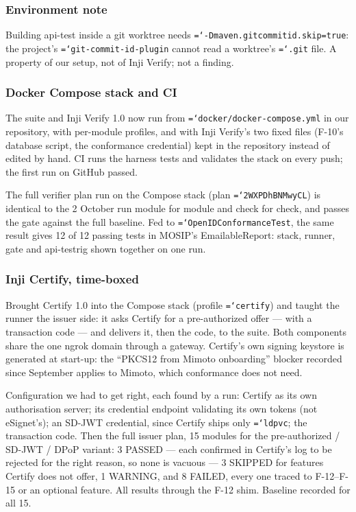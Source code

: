 \documentclass[11pt,a4paper]{article}
\let\origtexttt\texttt
\renewcommand{\texttt}[1]{\origtexttt{\hyphenchar\font=`\-\relax #1}}
\renewcommand{\_}{\textunderscore\allowbreak}
\begin{document}
\subsubsection*{Environment note}
Building api-test inside a git worktree needs \texttt{-Dmaven.gitcommitid.skip=true}: the
project's \texttt{git-commit-id-plugin} cannot read a worktree's \texttt{.git} file. A property of
our setup, not of Inji Verify; not a finding.

\subsubsection*{Docker Compose stack and CI}
The suite and Inji Verify 1.0 now run from \texttt{docker/docker-compose.yml} in our repository,
with per-module profiles, and with Inji Verify's two fixed files (F-10's database script, the
conformance credential) kept in the repository instead of edited by hand. CI runs the harness
tests and validates the stack on every push; the first run on GitHub passed.

The full verifier plan run on the Compose stack (plan \texttt{2WXPDhBNMwyCL}) is identical to
the 2 October run module for module and check for check, and passes the gate against the full
baseline. Fed to \texttt{OpenIDConformanceTest}, the same result gives 12 of 12 passing tests in
MOSIP's EmailableReport: stack, runner, gate and api-testrig shown together on one run.

\subsubsection*{Inji Certify, time-boxed}
Brought Certify 1.0 into the Compose stack (profile \texttt{certify}) and taught the runner the
issuer side: it asks Certify for a pre-authorized offer --- with a transaction code --- and
delivers it, then the code, to the suite. Both components share the one ngrok domain through a
gateway. Certify's own signing keystore is generated at start-up: the ``PKCS12 from Mimoto
onboarding'' blocker recorded since September applies to Mimoto, which conformance does not need.

Configuration we had to get right, each found by a run: Certify as its own authorisation server;
its credential endpoint validating its own tokens (not eSignet's); an SD-JWT credential, since
Certify ships only \texttt{ldp\_vc}; the transaction code. Then the full issuer plan, 15 modules
for the pre-authorized / SD-JWT / DPoP variant: 3 PASSED --- each confirmed in Certify's log to be
rejected for the right reason, so none is vacuous --- 3 SKIPPED for features Certify does not
offer, 1 WARNING, and 8 FAILED, every one traced to F-12--F-15 or an optional feature. All
results through the F-12 shim. Baseline recorded for all 15.
\end{document}
